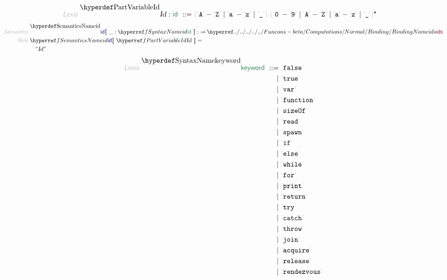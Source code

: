 \begin{align*}
  \KEY{Lexis} ~ 
    \VARDECL{Id} : \SYN{id}
      ~ ::= ~ & \LEFTGROUP \LEX{A} - \LEX{Z} \mid \LEX{a} - \LEX{z} \mid \LEX{\UNDERSCORE } \RIGHTGROUP ~ \LEFTGROUP \LEX{0} - \LEX{9} \mid \LEX{A} - \LEX{Z} \mid \LEX{a} - \LEX{z} \mid \LEX{\UNDERSCORE } \RIGHTGROUP\STAR
\end{align*}
\begin{align*}
  \KEY{Semantics} ~ 
  & \SEMDECL{id} \LEFTPHRASE ~ \_ : \SYNREF{id} ~ \RIGHTPHRASE  
    :  \TO \NAMEHYPER{../../../../../Funcons-beta/Computations/Normal}{Binding}{ids}
\\
  \KEY{Rule} ~ 
    & \SEMREF{id} \LEFTPHRASE ~ \VARREF{Id} ~ \RIGHTPHRASE  = \\&\quad
      \textsf{\textquotedblleft}\VAR{Id}\textsf{\textquotedblright}
\end{align*}
\begin{align*}
  \KEY{Lexis} ~ 
     \SYNDECL{keyword}
      ~ ::= ~ &
      \LEX{false} \\
      ~ \mid ~ &  \LEX{true} \\
      ~ \mid ~ &  \LEX{var} \\
      ~ \mid ~ &  \LEX{function} \\
      ~ \mid ~ &  \LEX{sizeOf} \\
      ~ \mid ~ &  \LEX{read} \\
      ~ \mid ~ &  \LEX{spawn} \\
      ~ \mid ~ &  \LEX{if} \\
      ~ \mid ~ &  \LEX{else} \\
      ~ \mid ~ &  \LEX{while} \\
      ~ \mid ~ &  \LEX{for} \\
      ~ \mid ~ &  \LEX{print} \\
      ~ \mid ~ &  \LEX{return} \\
      ~ \mid ~ &  \LEX{try} \\
      ~ \mid ~ &  \LEX{catch} \\
      ~ \mid ~ &  \LEX{throw} \\
      ~ \mid ~ &  \LEX{join} \\
      ~ \mid ~ &  \LEX{acquire} \\
      ~ \mid ~ &  \LEX{release} \\
      ~ \mid ~ &  \LEX{rendezvous}
\end{align*}
